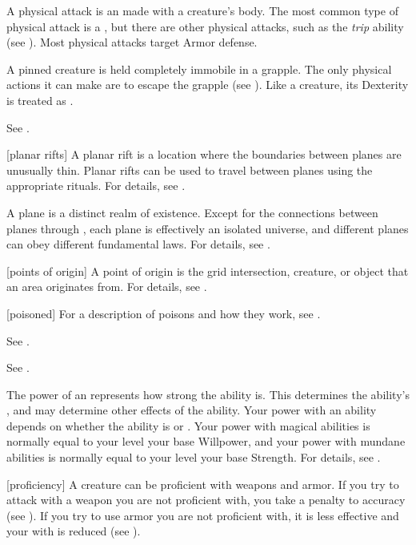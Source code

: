  A physical attack is an  made with a creature's body.
The most common type of physical attack is a , but there are other physical attacks, such as the \textit{trip} ability (see ).
Most physical attacks target Armor defense.

 A pinned creature is held completely immobile in a grapple.
The only physical actions it can make are to escape the grapple (see ).
Like a  creature, its Dexterity is treated as .

 See .

[planar rifts] A planar rift is a location where the boundaries between planes are unusually thin.
Planar rifts can be used to travel between planes using the appropriate rituals.
For details, see .

 A plane is a distinct realm of existence.
Except for the connections between planes through , each plane is effectively an isolated universe, and different planes can obey different fundamental laws.
For details, see .

[points of origin] A point of origin is the grid intersection, creature, or object that an area originates from.
For details, see .

[poisoned] For a description of poisons and how they work, see .

 See .

 See .

 The power of an  represents how strong the ability is.
This determines the ability's , and may determine other effects of the ability.
Your power with an ability depends on whether the ability is  or .
Your power with magical abilities is normally equal to your level \add your base Willpower, and your power with mundane abilities is normally equal to your level \add your base Strength.
For details, see .

[proficiency] A creature can be proficient with weapons and armor.
If you try to attack with a weapon you are not proficient with, you take a  penalty to accuracy (see ).
If you try to use armor you are not proficient with, it is less effective and your  with  is reduced (see ).

